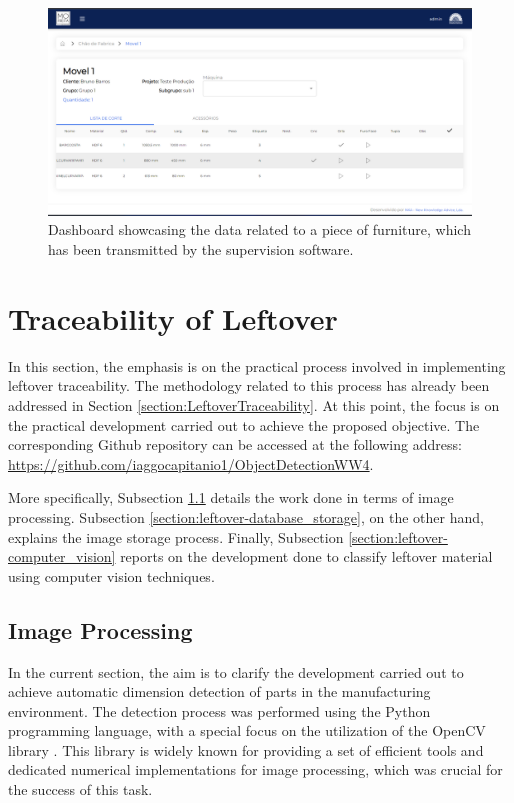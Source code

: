\begin{figure}[!ht]
 \centering
         \centering
         \includegraphics[width=0.65\linewidth]{images/Development/chap4/dashboard_02.png}
         \caption{Dashboard showcasing the data related to a piece of furniture, which has been transmitted by the supervision software.}
         \label{fig:dashboard02}
\end{figure}


\section{Traceability of Leftover}\label{section:leftover}

In this section, the emphasis is on the practical process involved in implementing leftover traceability. The methodology related to this process has already been addressed in Section \ref{section:LeftoverTraceability}. At this point, the focus is on the practical development carried out to achieve the proposed objective. The corresponding Github repository can be accessed at the following address: \url{https://github.com/iaggocapitanio1/ObjectDetectionWW4}.

More specifically, Subsection \ref{section:leftover-image_processing} details the work done in terms of image processing. Subsection \ref{section:leftover-database_storage}, on the other hand, explains the image storage process. Finally, Subsection \ref{section:leftover-computer_vision} reports on the development done to classify leftover material using computer vision techniques.

\subsection{Image Processing}\label{section:leftover-image_processing}
In the current section, the aim is to clarify the development carried out to achieve automatic dimension detection of parts in the manufacturing environment. The detection process was performed using the Python programming language, with a special focus on the utilization of the OpenCV library \cite{opencv_library}. This library is widely known for providing a set of efficient tools and dedicated numerical implementations for image processing, which was crucial for the success of this task.

